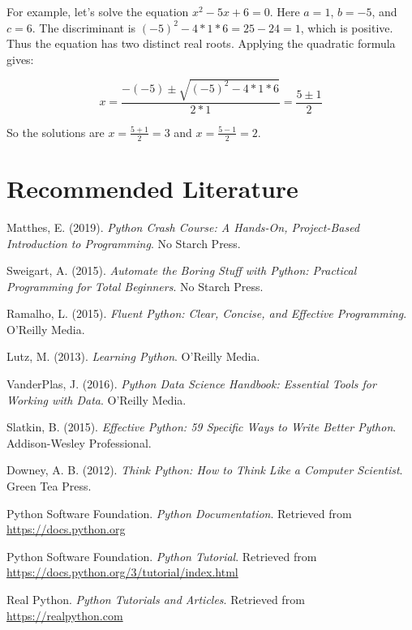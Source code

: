 \documentclass[12pt]{article}
\begin{document}
For example, let's solve the equation $x^2 - 5x + 6 = 0$. Here $a=1$, $b=-5$, and $c=6$. The discriminant is $(-5)^2 - 4*1*6 = 25 - 24 = 1$, which is positive. Thus the equation has two distinct real roots. Applying the quadratic formula gives:

\[x = \frac{-(-5) \pm \sqrt{(-5)^2 - 4*1*6}}{2*1} = \frac{5 \pm 1}{2}\]

So the solutions are $x = \frac{5 + 1}{2} = 3$ and $x = \frac{5 - 1}{2} = 2$.

\newpage
\section*{Recommended Literature}

\begin{thebibliography}{9}

 Matthes, E. (2019). \textit{Python Crash Course: A Hands-On, Project-Based Introduction to Programming}. No Starch Press.

 Sweigart, A. (2015). \textit{Automate the Boring Stuff with Python: Practical Programming for Total Beginners}. No Starch Press.

 Ramalho, L. (2015). \textit{Fluent Python: Clear, Concise, and Effective Programming}. O'Reilly Media.

 Lutz, M. (2013). \textit{Learning Python}. O'Reilly Media.

 VanderPlas, J. (2016). \textit{Python Data Science Handbook: Essential Tools for Working with Data}. O'Reilly Media.

 Slatkin, B. (2015). \textit{Effective Python: 59 Specific Ways to Write Better Python}. Addison-Wesley Professional.

 Downey, A. B. (2012). \textit{Think Python: How to Think Like a Computer Scientist}. Green Tea Press.

 Python Software Foundation. \textit{Python Documentation}. Retrieved from \url{https://docs.python.org}

 Python Software Foundation. \textit{Python Tutorial}. Retrieved from \url{https://docs.python.org/3/tutorial/index.html}

 Real Python. \textit{Python Tutorials and Articles}. Retrieved from \url{https://realpython.com}

\end{thebibliography}

\newpage
\printbibliography
\end{document}
